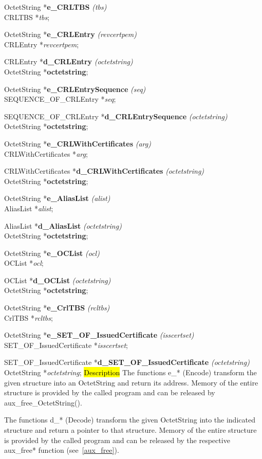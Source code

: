 OctetString *{\bf e\_CRLTBS} {\em (tbs)} \\
CRLTBS *{\em tbs};

OctetString *{\bf e\_CRLEntry} {\em (revcertpem)} \\
CRLEntry *{\em revcertpem};

CRLEntry *{\bf d\_CRLEntry} {\em (octetstring)} \\
OctetString *{\bf octetstring};

OctetString *{\bf e\_CRLEntrySequence} {\em (seq)} \\
SEQUENCE\_OF\_CRLEntry *{\em seq};

SEQUENCE\_OF\_CRLEntry *{\bf d\_CRLEntrySequence} {\em (octetstring)} \\
OctetString *{\bf octetstring};

OctetString *{\bf e\_CRLWithCertificates} {\em (arg)} \\
CRLWithCertificates *{\em arg};

CRLWithCertificates *{\bf d\_CRLWithCertificates} {\em (octetstring)} \\
OctetString *{\bf octetstring};

OctetString *{\bf e\_AliasList} {\em (alist)} \\
AliasList *{\em alist};

AliasList *{\bf d\_AliasList} {\em (octetstring)} \\
OctetString *{\bf octetstring};

OctetString *{\bf e\_OCList} {\em (ocl)} \\
OCList *{\em ocl};

OCList *{\bf d\_OCList} {\em (octetstring)} \\
OctetString *{\bf octetstring};

OctetString *{\bf e\_CrlTBS} {\em (rcltbs)} \\
CrlTBS *{\em rcltbs};

OctetString *{\bf e\_SET\_OF\_IssuedCertificate} {\em (isscertset)} \\
SET\_OF\_IssuedCertificate  *{\em isscertset};

SET\_OF\_IssuedCertificate  *{\bf d\_SET\_OF\_IssuedCertificate} {\em (octetstring)}
OctetString *{\em octetstring};
\hl{Description}     
The functions e\_* (Encode) transform the given structure into an OctetString
and return its address. Memory of the entire structure is provided 
by the called program and can be released
by aux\_free\_OctetString().

The functions d\_* (Decode) transform the given OctetString into the indicated structure and return
a pointer to that structure. Memory of the entire structure is provided 
by the called program and can be released by the respective aux\_free* function (see~\ref{aux_free}).

